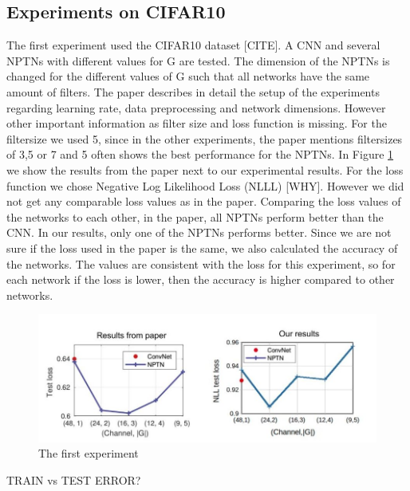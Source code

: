 \documentclass{llncs}
\begin{document}
\subsection{Experiments on CIFAR10}
The first experiment used the CIFAR10 dataset [CITE]. A CNN and several NPTNs with different values for G are tested. The dimension of the NPTNs is changed for the different values of G such that all networks have the same amount of filters.
The paper describes in detail the setup of the experiments regarding learning rate, data preprocessing and network dimensions. However other important information as filter size and loss function is missing. 
For the filtersize we used 5, since in the other experiments, the paper mentions  filtersizes of 3,5 or 7 and 5 often shows the best performance for the NPTNs. 
In Figure \ref{pic:first_experiment} we show the results from the paper next to our experimental results. For the loss function we chose Negative Log Likelihood Loss (NLLL) [WHY]. 
However we did not get any comparable loss values as in the paper. Comparing the loss values of the networks to each other, in the paper, all NPTNs perform better than the CNN. In our results, only one of the NPTNs performs better.
Since we are not sure if the loss used in the paper is the same, we also calculated the accuracy of the networks. The values are consistent with the loss for this experiment, so for each network if the loss is lower, then the accuracy is higher compared to other networks.

\begin{figure}
	\begin{center}
	\includegraphics[scale=0.35]{result_images/experiment1.jpg}
	\caption{The first experiment}
	\label{pic:first_experiment}
	\end{center}
\end{figure}

TRAIN vs TEST ERROR?
\end{document}
